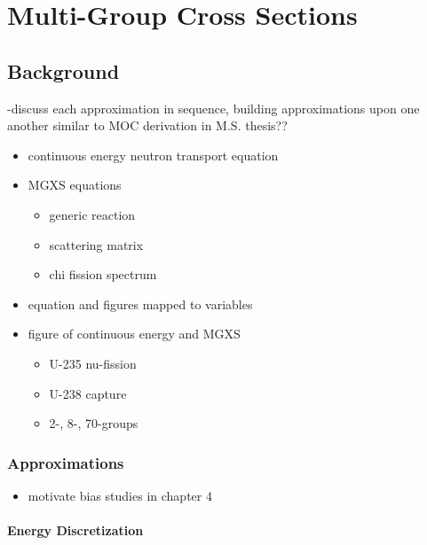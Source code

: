\chapter{Multi-Group Cross Sections}
\label{chap:mgxs}

\section{Background}
\label{sec:chap2-background}

-discuss each approximation in sequence, building approximations upon one another similar to \ac{MOC} derivation in M.S. thesis?? \\

\begin{itemize}
  \item continuous energy neutron transport equation
  \item \ac{MGXS} equations
  \begin{itemize}
    \item generic reaction
    \item scattering matrix
    \item chi fission spectrum
  \end{itemize}
  \item equation and figures mapped to variables
  \item figure of continuous energy and \ac{MGXS}
  \begin{itemize}
    \item U-235 nu-fission
    \item U-238 capture
    \item 2-, 8-, 70-groups
  \end{itemize}
\end{itemize}


\subsection{Approximations}
\label{subsec:chap2-approx}

\begin{itemize}
  \item motivate bias studies in chapter 4
\end{itemize}

\subsubsection{Energy Discretization}
\label{subsubsec:chap2-energy-discrete}


